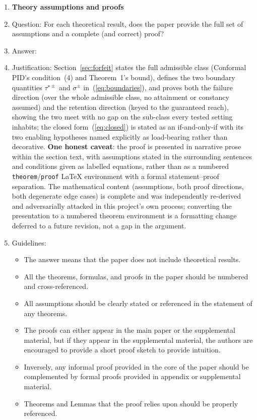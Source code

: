 \begin{enumerate}
\item {\bf Theory assumptions and proofs}
    \item[] Question: For each theoretical result, does the paper provide the full set of assumptions and a complete (and correct) proof?
    \item[] Answer: \answerYes{}
    \item[] Justification: Section~\ref{sec:forfeit} states the full admissible class (Conformal PID's condition~(4) and Theorem~1's bound), defines the two boundary quantities $\tau^{\star\pm}$ and $\sigma^{\pm}$ in~(\ref{eq:boundaries}), and proves both the failure direction (over the whole admissible class, no attainment or constancy assumed) and the retention direction (keyed to the guaranteed reach), showing the two meet with no gap on the sub-class every tested setting inhabits; the closed form~(\ref{eq:closed}) is stated as an if-and-only-if with its two enabling hypotheses named explicitly as load-bearing rather than decorative. \textbf{One honest caveat}: the proof is presented in narrative prose within the section text, with assumptions stated in the surrounding sentences and conditions given as labelled equations, rather than as a numbered \texttt{theorem}/\texttt{proof} LaTeX environment with a formal statement--proof separation. The mathematical content (assumptions, both proof directions, both degenerate edge cases) is complete and was independently re-derived and adversarially attacked in this project's own process; converting the presentation to a numbered theorem environment is a formatting change deferred to a future revision, not a gap in the argument.
    \item[] Guidelines:
    \begin{itemize}
        \item The answer \answerNA{} means that the paper does not include theoretical results.
        \item All the theorems, formulas, and proofs in the paper should be numbered and cross-referenced.
        \item All assumptions should be clearly stated or referenced in the statement of any theorems.
        \item The proofs can either appear in the main paper or the supplemental material, but if they appear in the supplemental material, the authors are encouraged to provide a short proof sketch to provide intuition.
        \item Inversely, any informal proof provided in the core of the paper should be complemented by formal proofs provided in appendix or supplemental material.
        \item Theorems and Lemmas that the proof relies upon should be properly referenced.
    \end{itemize}


\end{enumerate}

